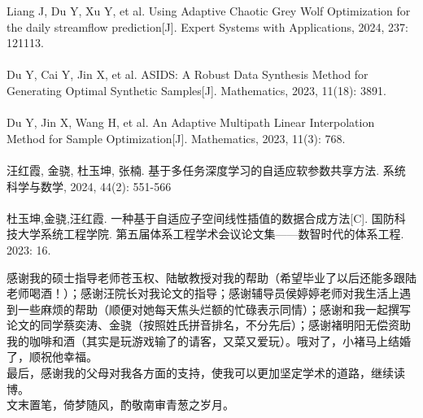 \documentclass{NauThesis}
\begin{document}
\begin{ResearchAchievements}

\noindent
Liang J, Du Y, Xu Y, et al. Using Adaptive Chaotic Grey Wolf Optimization for the daily streamflow prediction[J]. Expert Systems with Applications, 2024, 237: 121113.\\ 
\\
Du Y, Cai Y, Jin X, et al. ASIDS: A Robust Data Synthesis Method for Generating Optimal Synthetic Samples[J]. Mathematics, 2023, 11(18): 3891.\\ 
\\
Du Y, Jin X, Wang H, et al. An Adaptive Multipath Linear Interpolation Method for Sample Optimization[J]. Mathematics, 2023, 11(3): 768.\\ 
\\
汪红霞, 金骁, 杜玉坤, 张楠. 基于多任务深度学习的自适应软参数共享方法. 系统科学与数学, 2024, 44(2): 551-566\\ 
\\
杜玉坤,金骁,汪红霞. 一种基于自适应子空间线性插值的数据合成方法[C]. 国防科技大学系统工程学院. 第五届体系工程学术会议论文集——数智时代的体系工程. 2023: 16.

\end{ResearchAchievements}

\begin{ThanksPage}
感谢我的硕士指导老师苍玉权、陆敏教授对我的帮助（希望毕业了以后还能多跟陆老师喝酒！）；感谢汪院长对我论文的指导；感谢辅导员侯婷婷老师对我生活上遇到一些麻烦的帮助（顺便对她每天焦头烂额的忙碌表示同情）；感谢和我一起撰写论文的同学蔡奕涛、金骁（按照姓氏拼音排名，不分先后）；感谢褚明阳无偿资助我的咖啡和酒（其实是玩游戏输了的请客，又菜又爱玩）。哦对了，小褚马上结婚了，顺祝他幸福。
\\\hspace*{2em}最后，感谢我的父母对我各方面的支持，使我可以更加坚定学术的道路，继续读博。
\\\hspace*{2em}文末置笔，倚梦随风，酌敬南审青葱之岁月。
\end{ThanksPage}
\end{document}
